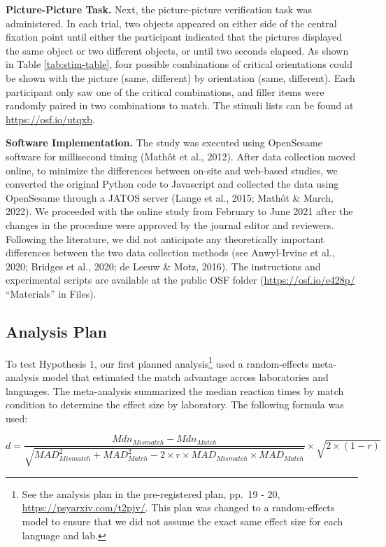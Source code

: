 \documentclass[
  man,floatsintext]{apa7}
\begin{document}
\textbf{Picture-Picture Task.} Next, the picture-picture verification task
was administered. In each trial, two objects appeared on either side of
the central fixation point until either the participant indicated that
the pictures displayed the same object or two different objects, or
until two seconds elapsed. As shown in Table \ref{tab:stim-table}, four
possible combinations of critical orientations could be shown with the
picture (same, different) by orientation (same, different). Each
participant only saw one of the critical combinations, and filler items
were randomly paired in two combinations to match. The stimuli lists can
be found at \url{https://osf.io/utqxb}.

\textbf{Software Implementation.} The study was executed using OpenSesame
software for millisecond timing
(Mathôt et al., 2012). After data collection moved
online, to minimize the differences between on-site and web-based
studies, we converted the original Python code to Javascript and
collected the data using OpenSesame through a JATOS server
(Lange et al., 2015; Mathôt \& March, 2022). We proceeded with
the online study from February to June 2021 after the changes in the
procedure were approved by the journal editor and reviewers. Following
the literature, we did not anticipate any theoretically important
differences between the two data collection methods (see Anwyl-Irvine et al., 2020; Bridges et al., 2020; de Leeuw \& Motz, 2016). The instructions and experimental
scripts are available at the public OSF folder (\url{https://osf.io/e428p/}
``Materials'' in Files).

\hypertarget{analysis-plan}{%
\subsection{Analysis Plan}\label{analysis-plan}}

To test Hypothesis 1, our first planned analysis\footnote{See the analysis plan in the pre-registered plan, pp.~19 - 20,
  \url{https://psyarxiv.com/t2pjv/}. This plan was changed to a
  random-effects model to ensure that we did not assume the exact same
  effect size for each language and lab.} used a
random-effects meta-analysis model that estimated the match advantage
across laboratories and languages. The meta-analysis summarized the
median reaction times by match condition to determine the effect size by
laboratory. The following formula was used:

\[d = \frac{Mdn_{Mismatch} - Mdn_{Match}}{\sqrt{MAD_{Mismatch}^2 + MAD_{Match}^2-2\times r\times MAD_{Mismatch} \times MAD_{Match}}} \times \sqrt{2 \times (1-r)}\]
\end{document}
